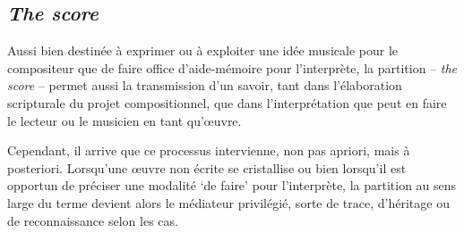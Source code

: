 \documentclass{article}
\begin{document}
%
%
%
%
%
%
%
%
%
%
%
%

\subsection{\textsl{The score}}

Aussi bien destinée à exprimer ou à exploiter une idée musicale pour le compositeur que de faire office d'aide-mémoire pour l'interprète, la partition -- \textsl{the score} -- permet aussi la transmission d'un savoir, tant dans l'élaboration scripturale du projet compositionnel, que dans l'interprétation que peut en faire le lecteur ou le musicien en tant qu'œuvre.





Cependant, il arrive que ce processus intervienne, non pas apriori, mais à posteriori. Lorsqu'une œuvre non écrite se cristallise ou bien lorsqu'il est opportun de préciser une modalité `de faire' pour l'interprète, la partition au sens large du terme devient alors le médiateur privilégié, sorte de trace, d'héritage ou de reconnaissance selon les cas.
\end{document}

